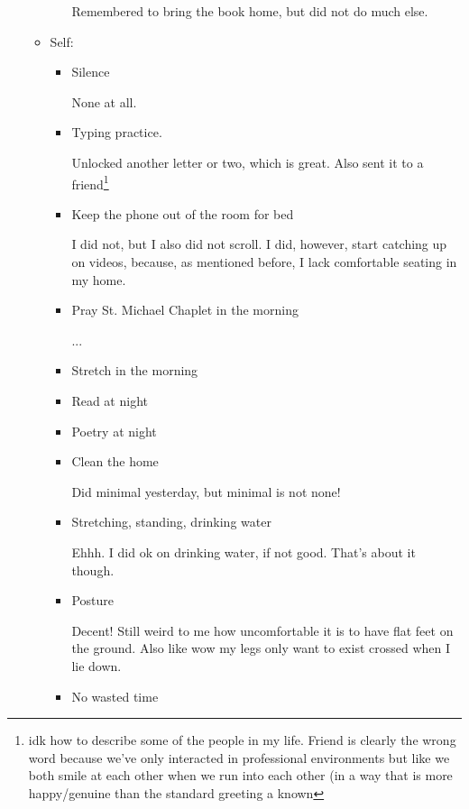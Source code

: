 \documentclass[12pt]{article}
\renewcommand{\,}{\textsuperscript{,}}
\begin{document}
\begin{itemize}
\begin{itemize}
\begin{itemize}
Remembered to bring the book home, but did not do much else.

\end{itemize}

\item Self:

\begin{itemize}

\item Silence

None at all.

\item Typing practice.

Unlocked another letter or two, which is great. Also sent it to a friend\footnote{idk how to describe some of the people in my life. Friend is clearly the wrong word because we've only interacted in professional environments but like we both smile at each other when we run into each other (in a way that is more happy/genuine than the standard greeting a known}

\item Keep the phone out of the room for bed

I did not, but I also did not scroll.  
I did, however, start catching up on videos, because, as mentioned before, I lack comfortable seating in my home.

\item Pray St. Michael Chaplet in the morning

...

\item Stretch in the morning

\item Read at night

\item Poetry at night

\item Clean the home

Did minimal yesterday, but minimal is not none!

\item Stretching, standing, drinking water

Ehhh. I did ok on drinking water, if not good. That's about it though.

\item Posture

Decent! Still weird to me how uncomfortable it is to have flat feet on the ground.  
Also like wow my legs only want to exist crossed when I lie down.

\item No wasted time


\end{itemize}
\end{itemize}
\end{itemize}
\end{document}
